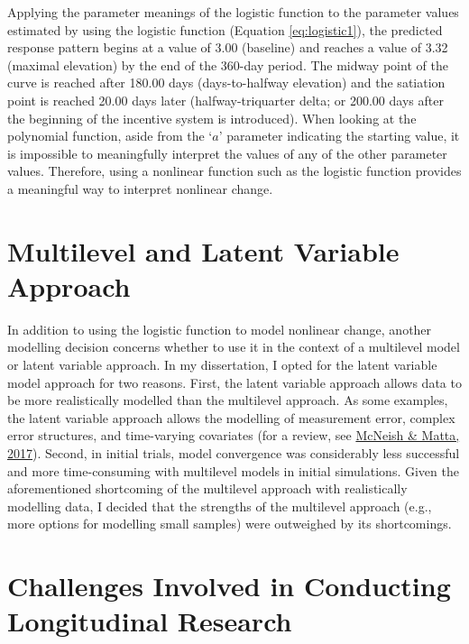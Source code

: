 \documentclass[
12pt, %
twoside,
english]{guelphthesis}
\begin{document}
\noindent Applying the parameter meanings of the logistic function to the parameter values estimated by using the logistic function (Equation \ref{eq:logistic1}), the predicted response pattern begins at a value of 3.00 (baseline) and reaches a value of 3.32 (maximal elevation) by the end of the 360-day period. The midway point of the curve is reached after 180.00 days (days-to-halfway elevation) and the satiation point is reached 20.00 days later (halfway-triquarter delta; or 200.00 days after the beginning of the incentive system is introduced). When looking at the polynomial function, aside from the `\(a\)' parameter indicating the starting value, it is impossible to meaningfully interpret the values of any of the other parameter values. Therefore, using a nonlinear function such as the logistic function provides a meaningful way to interpret nonlinear change.

\hypertarget{multilevel-and-latent-variable-approach}{%
\section{Multilevel and Latent Variable Approach}\label{multilevel-and-latent-variable-approach}}

In addition to using the logistic function to model nonlinear change, another modelling decision concerns whether to use it in the context of a multilevel model or latent variable approach. In my dissertation, I opted for the latent variable model approach for two reasons. First, the latent variable approach allows data to be more realistically modelled than the multilevel approach. As some examples, the latent variable approach allows the modelling of measurement error, complex error structures, and time-varying covariates (for a review, see \protect\hyperlink{ref-mcneish2018}{McNeish \& Matta, 2017}). Second, in initial trials, model convergence was considerably less successful and more time-consuming with multilevel models in initial simulations. Given the aforementioned shortcoming of the multilevel approach with realistically modelling data, I decided that the strengths of the multilevel approach (e.g., more options for modelling small samples) were outweighed by its shortcomings.

\hypertarget{challenges-involved-in-conducting-longitudinal-research}{%
\section{Challenges Involved in Conducting Longitudinal Research}\label{challenges-involved-in-conducting-longitudinal-research}}
\end{document}
